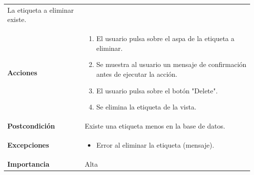 \documentclass[
]{article}
\providecommand{\tightlist}{%
  \setlength{\itemsep}{0pt}\setlength{\parskip}{0pt}}
\begin{document}
\begin{longtable}[]{@{}ll@{}}
\begin{minipage}[t]{0.72\columnwidth}
La etiqueta a eliminar existe.\strut
\end{minipage}\tabularnewline
\begin{minipage}[t]{0.22\columnwidth}\raggedright
\textbf{Acciones}\strut
\end{minipage} & \begin{minipage}[t]{0.72\columnwidth}\raggedright
\begin{enumerate}
\def\labelenumi{\arabic{enumi}.}
\tightlist
\item
  El usuario pulsa sobre el aspa de la etiqueta a eliminar.
\item
  Se muestra al usuario un mensaje de confirmación antes de ejecutar la
  acción.
\item
  El usuario pulsa sobre el botón "Delete".
\item
  Se elimina la etiqueta de la vista.
\end{enumerate}\strut
\end{minipage}\tabularnewline
\begin{minipage}[t]{0.22\columnwidth}\raggedright
\textbf{Postcondición}\strut
\end{minipage} & \begin{minipage}[t]{0.72\columnwidth}\raggedright
Existe una etiqueta menos en la base de datos.\strut
\end{minipage}\tabularnewline
\begin{minipage}[t]{0.22\columnwidth}\raggedright
\textbf{Excepciones}\strut
\end{minipage} & \begin{minipage}[t]{0.72\columnwidth}\raggedright
\begin{itemize}
\tightlist
\item
  Error al eliminar la etiqueta (mensaje).
\end{itemize}\strut
\end{minipage}\tabularnewline
\begin{minipage}[t]{0.22\columnwidth}\raggedright
\textbf{Importancia}\strut
\end{minipage} & \begin{minipage}[t]{0.72\columnwidth}\raggedright
Alta\strut
\end{minipage}\tabularnewline
\bottomrule
\end{longtable}
\end{document}
